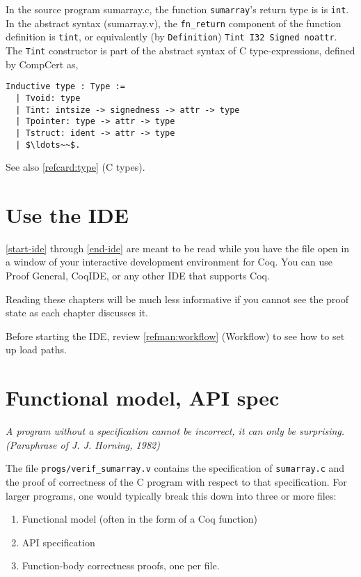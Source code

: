\documentclass[12pt,fleqn,openany,oneside,showtrims]{memoir}
\begin{document}
In the source program \textsf{sumarray.c},
the function \lstinline{sumarray}'s return type is
is \lstinline{int}.
In the abstract syntax (\textsf{sumarray.v}),
the \lstinline{fn_return} component of the function definition
is \lstinline{tint}, or equivalently
(by \lstinline{Definition})
\lstinline{Tint I32 Signed noattr}.
The \lstinline{Tint} constructor is
part of the abstract syntax of  C type-expressions,
defined by CompCert as,
\begin{lstlisting}
Inductive type : Type :=
  | Tvoid: type
  | Tint: intsize -> signedness -> attr -> type
  | Tpointer: type -> attr -> type
  | Tstruct: ident -> attr -> type
  | $\ldots~~$.
\end{lstlisting}
See also \autoref{refcard:type} (C types).

\chapter{Use the IDE}
\autoref{start-ide} through \autoref{end-ide}
are meant to be read
while you have the file 
open in a window of your interactive development
environment for Coq.  You can use Proof General,
CoqIDE, or any other IDE that supports Coq.

Reading these chapters will be much less
informative if you cannot see the
proof state as each chapter discusses it.

Before starting the IDE, review \autoref{refman:workflow} (Workflow)
to see how to set up load paths.

\chapter{Functional model, API spec}
\label{start-ide}\label{refcard:api-spec}

\emph{A program without a specification cannot be \emph{incorrect},
it can only be \emph{surprising}.  \hfill (Paraphrase of J. J. Horning, 1982)}

The file \lstinline{progs/verif_sumarray.v} contains
the specification of \lstinline{sumarray.c}
and the proof of correctness of the C program with respect
to that specification.  For larger programs, one would
typically break this down into three or more files:
\begin{enumerate}
\item Functional model (often in the form of a Coq function)
\item API specification
\item Function-body correctness proofs, one per file.
\end{enumerate}
\end{document}
